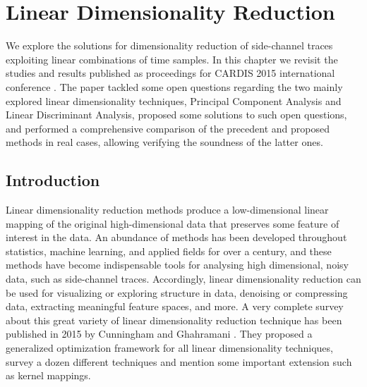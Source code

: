 
\chapter{Linear Dimensionality Reduction} 
\label{ChapterLinear}

We explore the solutions for dimensionality reduction of side-channel traces exploiting linear combinations of time samples. In this chapter we revisit the studies and results published as proceedings for CARDIS 2015 international conference \cite{Cagli2016}. The paper tackled some open questions regarding the two mainly explored linear dimensionality techniques, \ie Principal Component Analysis and Linear Discriminant Analysis, proposed some solutions to such open questions, and performed a comprehensive comparison of the precedent and proposed methods in real cases, allowing verifying the soundness of the latter ones.

\section{Introduction}
Linear dimensionality reduction methods produce a low-dimensional linear mapping of the original high-dimensional data that preserves some feature of interest in the data. An abundance of methods has been developed throughout statistics, machine learning, and applied fields for over a century, and these methods have become indispensable tools for analysing high dimensional, noisy data, such as side-channel traces.  Accordingly, linear dimensionality reduction can be used for visualizing or exploring structure in data, denoising or compressing data, extracting meaningful feature spaces, and more. A very complete survey about this great variety of linear dimensionality reduction technique has been published in 2015 by Cunningham and Ghahramani \cite{cunningham2015linear}. They proposed a generalized optimization framework for all linear dimensionality techniques, survey a dozen different techniques and mention some important extension such as kernel mappings. \\

